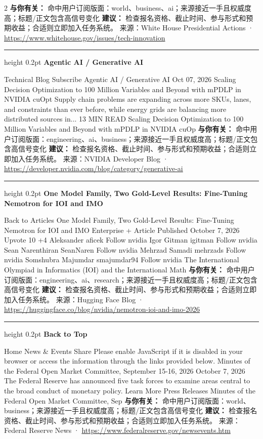\documentclass[10.5pt]{ctexart}
\begin{document}
\begin{multicols}{2}
\textbf{与你有关：} 命中用户订阅版面：world、business、ai；来源接近一手且权威度高；标题/正文包含高信号变化
\textbf{建议：} 检查报名资格、截止时间、参与形式和预期收益；合适则立即加入任务系统。
{\footnotesize\color{ormuted} 来源：White House Presidential Actions · \url{https://www.whitehouse.gov/issues/tech-innovation}}
\vspace{2mm}
\hrule height 0.2pt
\vspace{2mm}
{\large\bfseries Agentic AI / Generative AI}\par
Technical Blog Subscribe Agentic AI / Generative AI Oct 07, 2026 Scaling Decision Optimization to 100 Million Variables and Beyond with mPDLP in NVIDIA cuOpt Supply chain problems are expanding across more SKUs, lanes, and constraints than ever before, while energy grids are balancing more distributed sources in... 13 MIN READ Scaling Decision Optimization to 100 Million Variables and Beyond with mPDLP in NVIDIA cuOp
\textbf{与你有关：} 命中用户订阅版面：engineering、ai、business；来源接近一手且权威度高；标题/正文包含高信号变化
\textbf{建议：} 检查报名资格、截止时间、参与形式和预期收益；合适则立即加入任务系统。
{\footnotesize\color{ormuted} 来源：NVIDIA Developer Blog · \url{https://developer.nvidia.com/blog/category/generative-ai}}
\vspace{2mm}
\hrule height 0.2pt
\vspace{2mm}
{\large\bfseries One Model Family, Two Gold-Level Results: Fine-Tuning Nemotron for IOI and IMO}\par
Back to Articles One Model Family, Two Gold-Level Results: Fine-Tuning Nemotron for IOI and IMO Enterprise + Article Published October 7, 2026 Upvote 10 +4 Aleksander aficek Follow nvidia Igor Gitman igitman Follow nvidia Sean Narenthiran SeanNaren Follow nvidia Mehrzad Samadi mehrzads Follow nvidia Somshubra Majumdar smajumdar94 Follow nvidia The International Olympiad in Informatics (IOI) and the International Math
\textbf{与你有关：} 命中用户订阅版面：engineering、ai、research；来源接近一手且权威度高；标题/正文包含高信号变化
\textbf{建议：} 检查报名资格、截止时间、参与形式和预期收益；合适则立即加入任务系统。
{\footnotesize\color{ormuted} 来源：Hugging Face Blog · \url{https://huggingface.co/blog/nvidia/nemotron-ioi-and-imo-2026}}
\vspace{2mm}
\hrule height 0.2pt
\vspace{2mm}
{\large\bfseries Back to Top}\par
Home News \& Events Share Please enable JavaScript if it is disabled in your browser or access the information through the links provided below. Minutes of the Federal Open Market Committee, September 15-16, 2026 October 7, 2026 The Federal Reserve has announced five task forces to examine areas central to the broad conduct of monetary policy. Learn More Press Releases Minutes of the Federal Open Market Committee, Sep
\textbf{与你有关：} 命中用户订阅版面：world、business；来源接近一手且权威度高；标题/正文包含高信号变化
\textbf{建议：} 检查报名资格、截止时间、参与形式和预期收益；合适则立即加入任务系统。
{\footnotesize\color{ormuted} 来源：Federal Reserve News · \url{https://www.federalreserve.gov/newsevents.htm}}
\end{multicols}
\end{document}
